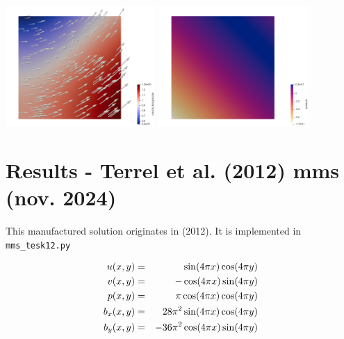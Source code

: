 \begin{center}
\includegraphics[width=5.7cm]{python_codes/fieldstone_120/paperresults/lire19/vel}
\includegraphics[width=5.7cm]{python_codes/fieldstone_120/paperresults/lire19/press}
\end{center}


\newpage
\section*{Results - Terrel et al. (2012) mms (nov. 2024)}

This manufactured solution originates in \textcite{tesk12} (2012).
It is implemented in \verb|mms_tesk12.py|

\begin{eqnarray}
u(x,y) &=& \sin(4\pi x)\cos(4 \pi y) \nonumber\\
v(x,y) &=& -\cos(4\pi x)\sin(4 \pi y) \nonumber\\
p(x,y) &=& \pi \cos(4 \pi x) \cos(4 \pi y) \nonumber\\
b_x(x,y) &=& 28 \pi^2 \sin(4 \pi x) \cos(4 \pi y) \nonumber\\
b_y(x,y) &=& -36 \pi^2 \cos(4 \pi x) \sin(4 \pi y) 
\end{eqnarray}


